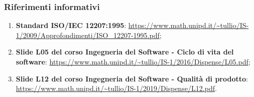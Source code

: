 \subsubsection{Riferimenti informativi}
\begin{enumerate}
	\item \textbf{Standard ISO/IEC 12207:1995}: \url{https://www.math.unipd.it/~tullio/IS-1/2009/Approfondimenti/ISO_12207-1995.pdf};
	\item \textbf{Slide L05 del corso Ingegneria del Software - Ciclo di vita del software}: \url{https://www.math.unipd.it/~tullio/IS-1/2016/Dispense/L05.pdf};
	\item \textbf{Slide L12 del corso Ingegneria del Software - Qualità di prodotto}: \url{https://www.math.unipd.it/~tullio/IS-1/2019/Dispense/L12.pdf}.

	
	
	
	
	
\end{enumerate}


